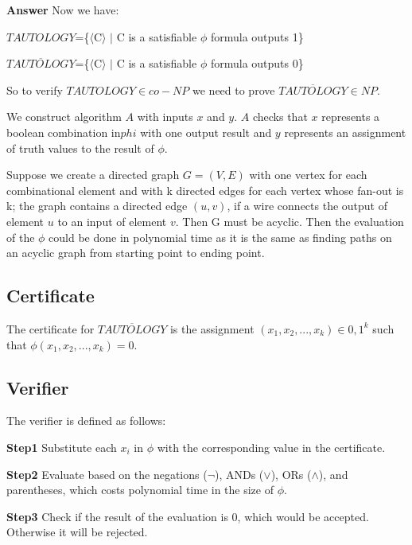 \documentclass[12pt]{article}
\begin{document}
\textbf{Answer}
Now we have:

 $TAUTOLOGY$=\{$\langle$C$\rangle$ $\mid$ C is a satisfiable $\phi$ formula outputs 1\}
 
 
 $\overline{TAUTOLOGY} $=\{$\langle$C$\rangle$ $\mid$ C is a satisfiable $\phi$ formula outputs 0\}
 
So to verify $TAUTOLOGY \in co-NP$ we need to prove $\overline{TAUTOLOGY} \in NP$. 
 
 
We construct algorithm $A$ with inputs $x$ and $y$.  $A$ checks that $x$ represents a boolean combination in$phi$  with one output result and $y$ represents an assignment of truth values to the result of $\phi$.

Suppose we create a directed graph $G=(V,E)$ with one vertex for each combinational element and with k directed edges for each vertex whose fan-out is k; the graph contains a directed edge $(u,v)$, if a wire connects the output of element $u$ to an input of element $v$. Then G must be acyclic. Then the evaluation of the $\phi$ could be done in polynomial time as it is the same as finding paths on an acyclic graph from starting point to ending point.

\subsection{Certificate}
The certificate for $\overline{TAUTOLOGY}$ is the assignment $(x_1,x_2,...,x_k) \in {0,1}^k$ such that $\phi(x_1,x_2,...,x_k) = 0$.

\subsection{Verifier}
The verifier is defined as follows:

\textbf{Step1} Substitute each $x_i$ in $\phi$ with the corresponding value in the certificate.

\textbf{Step2} Evaluate based on the negations ($\neg$), ANDs ($\vee$), ORs ($\wedge$), and parentheses, which costs polynomial time in the size of $\phi$.

\textbf{Step3} Check if the result of the evaluation is 0, which would be accepted. Otherwise it will be rejected. 
\end{document}
